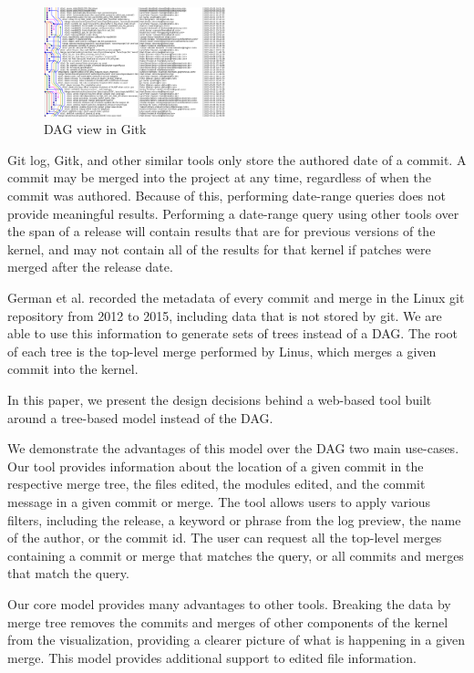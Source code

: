 \documentclass[conference, draftclsnofoot]{IEEEtran}
\begin{document}
\begin{figure}
	\centering
	\includegraphics[width=0.47\textwidth]{figures/gitk.png}
	\caption{DAG view in Gitk}
	\label{fig:gitk}
\end{figure}

Git log, Gitk, and other similar tools only store the authored date of a
commit. A commit may be merged into the project at any time, regardless of when
the commit was authored. Because of this, performing date-range queries does
not provide meaningful results. Performing a date-range query using other tools
over the span of a release will contain results that are for previous versions
of the kernel, and may not contain all of the results for that kernel if
patches were merged after the release date.

German et al. recorded the metadata of every commit and merge in the Linux git
repository from 2012 to 2015, including data that is not stored by git. We are
able to use this information to generate sets of trees instead of a DAG. The
root of each tree is the top-level merge performed by Linus, which merges a
given commit into the kernel.

In this paper, we present the design decisions behind a web-based tool built
around a tree-based model instead of the DAG.

We demonstrate the advantages of this model over the DAG two main use-cases.
Our tool provides information about the location of a given commit in the
respective merge tree, the files edited, the modules edited, and the commit
message in a given commit or merge. The tool allows users to apply various
filters, including the release, a keyword or phrase from the log preview, the
name of the author, or the commit id. The user can request all the top-level
merges containing a commit or merge that matches the query, or all commits and
merges that match the query.

Our core model provides many advantages to other tools. Breaking the data by
merge tree removes the commits and merges of other components of the kernel
from the visualization, providing a clearer picture of what is happening in a
given merge. This model provides additional support to edited file information.
\end{document}

